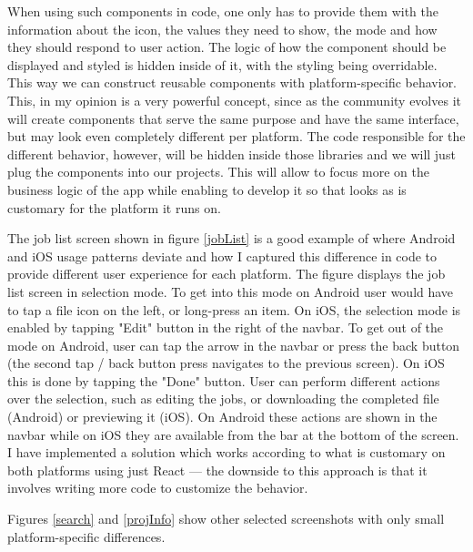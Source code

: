When using such components in code, one only has to provide them with the information about the icon, the values they need to show, the mode and how they should respond to user action. The logic of how the component should be displayed and styled is hidden inside of it, with the styling being overridable. This way we can construct reusable components with platform-specific behavior. This, in my opinion is a very powerful concept, since as the community evolves it will create components that serve the same purpose and have the same interface, but may look even completely different per platform. The code responsible for the different behavior, however, will be hidden inside those libraries and we will just plug the components into our projects. This will allow to focus more on the business logic of the app while enabling to develop it so that looks as is customary for the platform it runs on.

The job list screen shown in figure \ref{jobList} is a good example of where Android and iOS usage patterns deviate and how I captured this difference in code to provide different user experience for each platform. The figure displays the job list screen in selection mode. To get into this mode on Android user would have to tap a file icon on the left, or long-press an item. On iOS, the selection mode is enabled by tapping "Edit" button in the right of the navbar. To get out of the mode on Android, user can tap the arrow in the navbar or press the back button (the second tap / back button press navigates to the previous screen). On iOS this is done by tapping the "Done" button. User can perform different actions over the selection, such as editing the jobs, or downloading the completed file (Android) or previewing it (iOS). On Android these actions are shown in the navbar while on iOS they are available from the bar at the bottom of the screen. I have implemented a solution which works according to what is customary on both platforms using just React --- the downside to this approach is that it involves writing more code to customize the behavior.

Figures \ref{search} and \ref{projInfo} show other selected screenshots with only small platform-specific differences.


